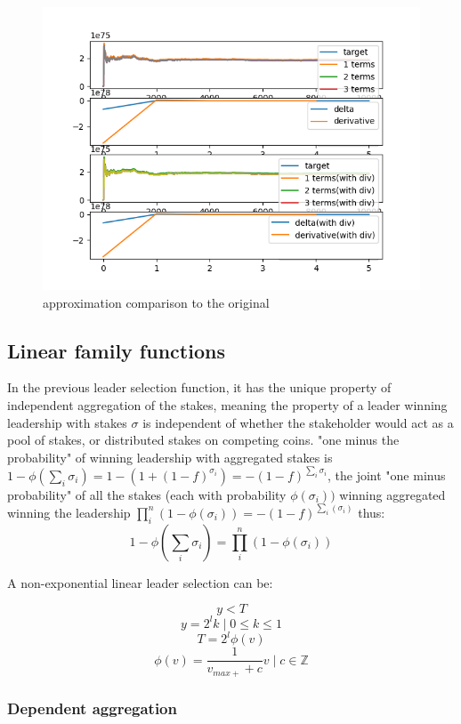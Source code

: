 \documentclass{article}
\begin{document}
\begin{figure}
  \includegraphics{target.png}
  \caption{approximation comparison to the original }
\end{figure}



\subsection {Linear family functions}

In the previous leader selection function, it has the unique
property of independent aggregation of the stakes, meaning the
property of a leader winning leadership with stakes $\sigma$
is independent of whether the stakeholder would act as a pool
of stakes, or distributed stakes on competing coins.  "one minus
the probability" of winning leadership with aggregated stakes is
$1-\phi(\sum_{i}\sigma_i)=1-(1+(1-f)^{\sigma_i})=-(1-f)^{\sum_{i}\sigma_i}$,
the joint "one minus probability" of all the stakes (each with
probability $\phi(\sigma_i))$ winning aggregated winning the leadership
$\prod_{i}^{n}(1-\phi(\sigma_i))=-(1-f)^{\sum_i(\sigma_i)}$ thus: $$
1-\phi(\sum_{i}\sigma_i) =\prod_{i}^{n}(1-\phi(\sigma_i)) $$

A non-exponential  linear leader selection can be:

$$y < T $$ $$y = 2^lk \mid 0 \le k \le 1$$ $$T = 2^l\phi(v)$$ $$
\phi(v)=\frac{1}{v_{max+}+c}v  \mid c \in \mathbb{Z}$$

\subsubsection{ Dependent aggregation}
\end{document}
